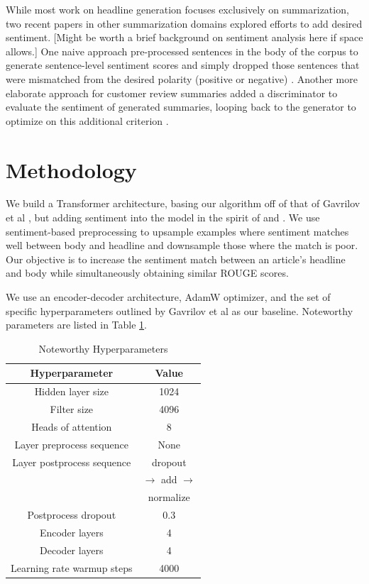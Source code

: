 \documentclass[11pt]{article}
\begin{document}
While most work on headline generation focuses exclusively on summarization, two recent papers in other summarization domains explored efforts to add desired sentiment. [Might be worth a brief background on sentiment analysis here if space allows.] One naive approach pre-processed sentences in the body of the corpus to generate sentence-level sentiment scores and simply dropped those sentences that were mismatched from the desired polarity (positive or negative) \cite{DBLP:journals/corr/abs-1802-09426}. Another more elaborate approach for customer review summaries added a discriminator to evaluate the sentiment of generated summaries, looping back to the generator to optimize on this additional criterion \cite{DBLP:journals/corr/HuYLSX17}. 

\section{Methodology}
We build a Transformer architecture, basing our algorithm off of that of Gavrilov et al \cite{DBLP:journals/corr/abs-1901-07786}, but adding sentiment into the model in the spirit of \cite{DBLP:journals/corr/abs-1802-09426} and \cite{DBLP:journals/corr/HuYLSX17}. We use sentiment-based preprocessing to upsample examples where sentiment matches well between body and headline and downsample those where the match is poor. Our objective is to increase the sentiment match between an article's headline and body while simultaneously obtaining similar ROUGE scores.

We use an encoder-decoder architecture, AdamW optimizer, and the set of specific hyperparameters outlined by Gavrilov et al \cite{DBLP:journals/corr/abs-1901-07786} as our baseline. Noteworthy parameters are listed in Table \ref{table:1}.
 
\begin{table}[h!]
\centering
\begin{tabular}{|c | c|} 
 \hline
 Hyperparameter & Value \\ [0.5ex] 
 \hline
 Hidden layer size & 1024 \\ 
 Filter size & 4096 \\
 Heads of attention & 8 \\
 Layer preprocess sequence & None \\
 Layer postprocess sequence & dropout \\
 & $\rightarrow$ add $\rightarrow$ \\
 & normalize \\
 Postprocess dropout & 0.3 \\
 Encoder layers & 4 \\
 Decoder layers & 4 \\
 Learning rate warmup steps & 4000 \\ [1ex]
 \hline
\end{tabular}
\caption{Noteworthy Hyperparameters}
\label{table:1}
\end{table}
\end{document}
